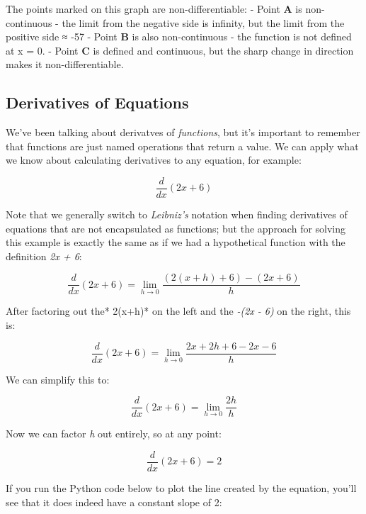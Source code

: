 \documentclass[11pt]{article}
\begin{document}
    The points marked on this graph are non-differentiable: - Point
\textbf{A} is non-continuous - the limit from the negative side is
infinity, but the limit from the positive side ≈ -57 - Point \textbf{B}
is also non-continuous - the function is not defined at x = 0. - Point
\textbf{C} is defined and continuous, but the sharp change in direction
makes it non-differentiable.

    \subsection{Derivatives of Equations}\label{derivatives-of-equations}

We've been talking about derivatves of \emph{functions}, but it's
important to remember that functions are just named operations that
return a value. We can apply what we know about calculating derivatives
to any equation, for example:

\begin{equation}\frac{d}{dx}(2x + 6)\end{equation}

Note that we generally switch to \emph{Leibniz's} notation when finding
derivatives of equations that are not encapsulated as functions; but the
approach for solving this example is exactly the same as if we had a
hypothetical function with the definition \emph{2x + 6}:

\begin{equation}\frac{d}{dx}(2x + 6) = \lim_{h \to 0} \frac{(2(x+h) + 6) - (2x + 6)}{h} \end{equation}

After factoring out the* 2(x+h)* on the left and the \emph{-(2x - 6)} on
the right, this is:

\begin{equation}\frac{d}{dx}(2x + 6) = \lim_{h \to 0} \frac{2x + 2h + 6 - 2x - 6}{h} \end{equation}

We can simplify this to:

\begin{equation}\frac{d}{dx}(2x + 6) = \lim_{h \to 0} \frac{2h}{h} \end{equation}

Now we can factor \emph{h} out entirely, so at any point:

\begin{equation}\frac{d}{dx}(2x + 6) = 2 \end{equation}

If you run the Python code below to plot the line created by the
equation, you'll see that it does indeed have a constant slope of 2:
\end{document}
